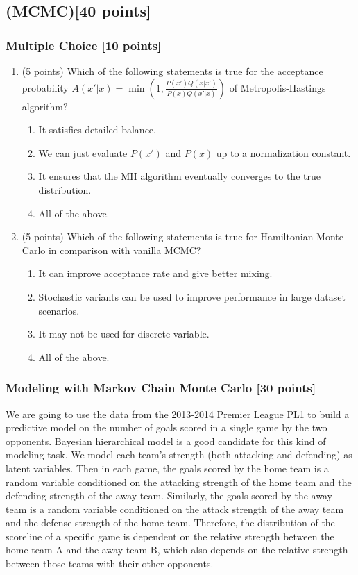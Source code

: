 \documentclass{article}
\begin{document}
\subsection{(MCMC)[40 points]}
\subsubsection{Multiple Choice [10 points]}
\begin{enumerate}
\item (5 points) Which of the following statements is true for the acceptance probability
$A(x'|x) = \min(1, \frac{P(x')Q(x|x')}{P(x)Q(x'|x)})$ of Metropolis-Hastings algorithm?
\begin{enumerate}
\item It satisfies detailed balance.
\item We can just evaluate $P(x')$ and $P(x)$ up to a normalization constant.
\item It ensures that the MH algorithm eventually converges to the true distribution.
\item All of the above.
\end{enumerate}

\item (5 points) Which of the following statements is true for Hamiltonian Monte Carlo in comparison with
vanilla MCMC?
\begin{enumerate}
\item It can improve acceptance rate and give better mixing.
\item Stochastic variants can be used to improve performance in large dataset scenarios.
\item It may not be used for discrete variable.
\item All of the above.
\end{enumerate}
\end{enumerate}

\subsubsection{Modeling with Markov Chain Monte Carlo [30 points]}

We are going to use the data from the 2013-2014 Premier League PL1 to build a predictive model on the
number of goals scored in a single game by the two opponents. Bayesian hierarchical model is a good
candidate for this kind of modeling task. We model each team's strength (both attacking and defending) as
latent variables. Then in each game, the goals scored by the home team is a random variable conditioned
on the attacking strength of the home team and the defending strength of the away team. Similarly, the
goals scored by the away team is a random variable conditioned on the attack strength of the away team
and the defense strength of the home team. Therefore, the distribution of the scoreline of a specific game is
dependent on the relative strength between the home team A and the away team B, which also depends on
the relative strength between those teams with their other opponents.
\end{document}
